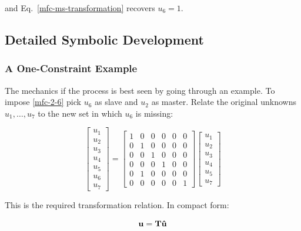 and Eq.~\eqref{mfc-ms-transformation} recovers $u_6=1$.

\subsection{Detailed Symbolic Development}

\subsubsection{A One-Constraint Example}

The mechanics if the process is best seen by going through an example. To impose
\eqref{mfc-2-6} pick $ u_6 $ as slave and $ u_2 $ as master. Relate the
original unknowns $ u_1, \dots, u_7 $ to the new set in which $ u_6 $ is missing:

\begin{equation}\label{nb-ch3-mfc-ms-transformation}
    \begin{bmatrix}
        u_1 \\
        u_2 \\
        u_3 \\
        u_4 \\
        u_5 \\
        u_6 \\
        u_7
    \end{bmatrix}
    = \begin{bmatrix}
        1 & 0 & 0 & 0 & 0 & 0 \\
        0 & 1 & 0 & 0 & 0 & 0 \\
        0 & 0 & 1 & 0 & 0 & 0 \\
        0 & 0 & 0 & 1 & 0 & 0 \\
        0 & 1 & 0 & 0 & 0 & 0 \\
        0 & 0 & 0 & 0 & 0 & 1
    \end{bmatrix}
    \begin{bmatrix}
        u_1 \\
        u_2 \\
        u_3 \\
        u_4 \\
        u_5 \\
        u_7
    \end{bmatrix}
\end{equation}

This is the required transformation relation. In compact form:

\begin{equation}
    \mathbf{u} = \mathbf{T} \mathbf{\hat{u}}
\end{equation}



